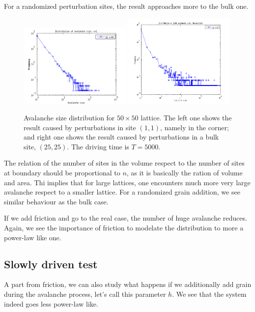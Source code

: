 For a randomized perturbation sites, the result approaches more to the bulk one. 
\begin{figure} 
\begin{center}
\includegraphics[width=0.49\textwidth]{results/sv1.png}
\includegraphics[width=0.49\textwidth]{results/sbulk_th.png} 
\caption{Avalanche size distribution for $50\times50$ lattice. 
The left one shows the result caused by perturbations in site $(1,1)$, namely in the corner; 
and right one shows the result caused by perturbations in a bulk site, $(25,25)$. The driving time is $T=5000$.  }
\label{sv}
\end{center}
\end{figure} 


The relation of the number of sites in the volume respect to the number of sites at boundary should be proportional to $n$, as it is basically the ration of volume and area.
Thi implies that for large lattices, one encounters much more very large avalanche respect to a smaller lattice. For a randomized grain addition, we see similar behaviour as the bulk case.

If we add friction and go to the real case, the number of huge avalanche reduces. Again, we see the importance of friction to modelate the distribution to more a power-law like one.

\subsection{Slowly driven test}
A part from friction, we can also study what happens if we additionally add grain during the avalanche process, let's call this parameter $h$.
We see that the system indeed goes less power-law like.


